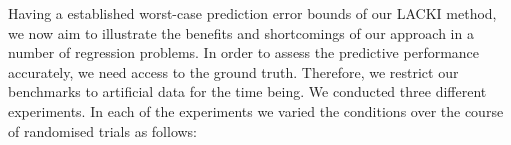 \documentclass{article} %
\theoremstyle{definition}
\theoremstyle{remark}
\begin{document}
% 
Having a established worst-case prediction error bounds of our LACKI method, we now aim to illustrate the benefits and shortcomings of our approach in a number of regression problems. In order to assess the predictive performance accurately, we need access to the ground truth. Therefore, we restrict our benchmarks to artificial data for the time being. 
We conducted three different experiments. In each of the experiments we varied the conditions over the course of randomised trials as follows:
\end{document}
